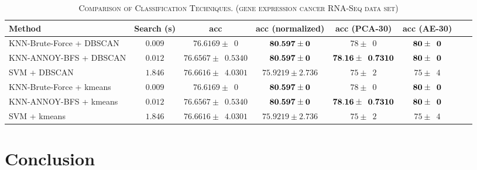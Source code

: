 \documentclass[twocolumn,10pt]{article}
\begin{document}
  \begin{table*}[htb]
    \newcommand{\z}{\phantom{0}}
    \caption{\textsc{Comparison of Classification Techniques. (gene expression cancer RNA-Seq data set)}}
      \vspace{-\baselineskip}
    \begin{tabular}{@{}lccccccl@{}}\toprule
    Method                    & Search (s) & acc                               & acc (normalized)             & acc (PCA-30)                   & acc (AE-30)\\ \midrule
    KNN-Brute-Force + DBSCAN  & $0.009$   & $76.6169 \pm \z{0}$                & $\bf{80.597 \pm 0}$          & $78 \pm \z{0}$                 & $\bf{80 \pm \z{0}}$\\
    KNN-ANNOY-BFS + DBSCAN    & $0.012$   & $76.6567 \pm \z{0.5340}$           & $\bf{80.597 \pm 0}$          & $\bf{78.16 \pm \z{0.7310}}$    & $\bf{80 \pm \z{0}}$\\
    SVM + DBSCAN              & $1.846$   & $76.6616 \pm \z{4.0301}$           & $75.9219 \pm 2.736$          & $75 \pm \z{2}$                 & $75 \pm \z{4}$\\
    KNN-Brute-Force + kmeans  & $0.009$   & $76.6169 \pm \z{0}$                & $\bf{80.597 \pm 0}$          & $78 \pm \z{0}$                 & $\bf{80 \pm \z{0}}$\\
    KNN-ANNOY-BFS + kmeans    & $0.012$   & $76.6567 \pm \z{0.5340}$           & $\bf{80.597 \pm 0}$          & $\bf{78.16 \pm \z{0.7310}}$    & $\bf{80 \pm \z{0}}$\\
    SVM + kmeans              & $1.846$   & $76.6616 \pm \z{4.0301}$           & $75.9219 \pm 2.736$          & $75 \pm \z{2}$                 & $75 \pm \z{4}$\\
    \end{tabular}
    \label{table:gene_expression_result}
      \vspace{-\baselineskip}
  \end{table*}
  
\section{Conclusion}



\end{document}
